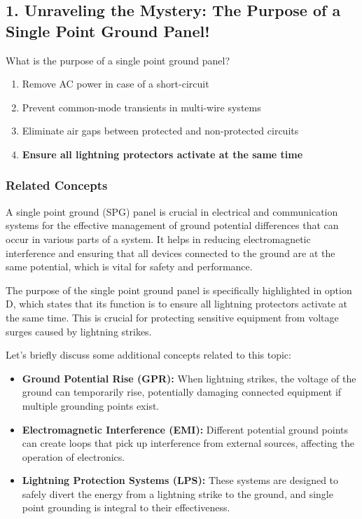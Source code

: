 \subsection{1. Unraveling the Mystery: The Purpose of a Single Point Ground Panel!}

\begin{tcolorbox}[colback=gray!10, colframe=black, title=E4E14] What is the purpose of a single point ground panel?
\begin{enumerate}[label=\Alph*.]
    \item Remove AC power in case of a short-circuit
    \item Prevent common-mode transients in multi-wire systems
    \item Eliminate air gaps between protected and non-protected circuits
    \item \textbf{Ensure all lightning protectors activate at the same time}
\end{enumerate} \end{tcolorbox}

\subsubsection{Related Concepts}

A single point ground (SPG) panel is crucial in electrical and communication systems for the effective management of ground potential differences that can occur in various parts of a system. It helps in reducing electromagnetic interference and ensuring that all devices connected to the ground are at the same potential, which is vital for safety and performance. 

The purpose of the single point ground panel is specifically highlighted in option D, which states that its function is to ensure all lightning protectors activate at the same time. This is crucial for protecting sensitive equipment from voltage surges caused by lightning strikes. 

Let's briefly discuss some additional concepts related to this topic:

\begin{itemize}
    \item \textbf{Ground Potential Rise (GPR):} When lightning strikes, the voltage of the ground can temporarily rise, potentially damaging connected equipment if multiple grounding points exist.
    \item \textbf{Electromagnetic Interference (EMI):} Different potential ground points can create loops that pick up interference from external sources, affecting the operation of electronics.
    \item \textbf{Lightning Protection Systems (LPS):} These systems are designed to safely divert the energy from a lightning strike to the ground, and single point grounding is integral to their effectiveness.
\end{itemize}

